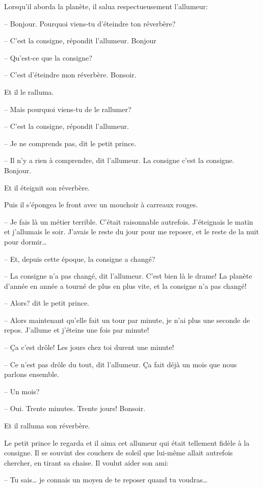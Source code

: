 \begin{Parallel}[p]{}{}
{Lorsqu'il aborda la planète, il salua respectueusement l'allumeur:

-- Bonjour. Pourquoi viens-tu d'éteindre ton réverbère?

-- C'est la consigne, répondit l'allumeur. Bonjour

-- Qu'est-ce que la consigne?

-- C'est d'éteindre mon réverbère. Bonsoir.

Et il le ralluma.

-- Mais pourquoi viens-tu de le rallumer?

-- C'est la consigne, répondit l'allumeur.

-- Je ne comprends pas, dit le petit prince.

-- Il n'y a rien à comprendre, dit l'allumeur. La
consigne c'est la consigne. Bonjour.

Et il éteignit son réverbère.

Puis il s'épongea le front avec un mouchoir à carreaux rouges.

-- Je fais là un métier terrible. C'était raisonnable
autrefois. J'éteignais le matin et j'allumais le soir.
J'avais le reste du jour pour me reposer, et le reste
de la nuit pour dormir\ldots{}

-- Et, depuis cette époque, la consigne a changé?

-- La consigne n'a pas changé, dit l'allumeur.
C'est bien là le drame! La planète d'année en année a tourné de plus en plus vite, et la consigne n'a
pas changé!

-- Alors? dit le petit prince.

-- Alors maintenant qu'elle fait un tour par
minute, je n'ai plus une seconde de repos. J'allume
et j'éteins une fois par minute!

-- Ça c'est drôle! Les jours chez toi durent une
minute!

-- Ce n'est pas drôle du tout, dit l'allumeur. Ça
fait déjà un mois que nous parlons ensemble.

-- Un mois?

-- Oui. Trente minutes. Trente jours! Bonsoir.

Et il ralluma son réverbère.

Le petit prince le regarda et il aima cet allumeur
qui était tellement fidèle à la consigne. Il se souvint
des couchers de soleil que lui-même allait autrefois
chercher, en tirant sa chaise. Il voulut aider son
ami:

-- Tu sais\ldots{} je connais un moyen de te reposer
quand tu voudras\ldots{}

}
\end{Parallel}
